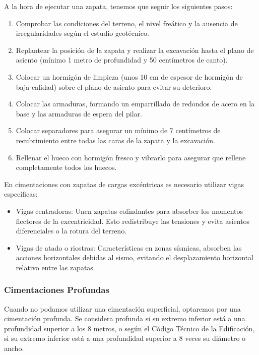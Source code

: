 A la hora de ejecutar una zapata, tenemos que seguir los siguientes pasos:
\begin{enumerate}
    \item Comprobar las condiciones del terreno, el nivel freático y la ausencia de irregularidades según el estudio geotécnico.
    \item Replantear la posición de la zapata y realizar la excavación hasta el plano de asiento (mínimo 1 metro de profundidad y 50 centímetros de canto).
    \item Colocar un hormigón de limpieza (unos 10 cm de espesor de hormigón de baja calidad) sobre el plano de asiento para evitar su deterioro.
    \item Colocar las armaduras, formando un emparrillado de redondos de acero en la base y las armaduras de espera del pilar.
    \item Colocar separadores para asegurar un mínimo de 7 centímetros de recubrimiento entre todas las caras de la zapata y la excavación.
    \item Rellenar el hueco con hormigón fresco y vibrarlo para asegurar que rellene completamente todos los huecos.
\end{enumerate}

En cimentaciones con zapatas de cargas excéntricas es necesario utilizar vigas específicas:

\begin{itemize}
    \item Vigas centradoras: Unen zapatas colindantes para absorber los momentos flectores de la excentricidad. Esto redistribuye las tensiones y evita asientos diferenciales o la rotura del terreno.
    \item Vigas de atado o riostras: Características en zonas sísmicas, absorben las acciones horizontales debidas al sismo, evitando el desplazamiento horizontal relativo entre las zapatas.
\end{itemize}

\subsubsection{Cimentaciones Profundas}

Cuando no podamos utilizar una cimentación superficial, optaremos por una cimentación profunda. Se considera profunda si su extremo inferior está a una profundidad superior a los 8 metros, o según el Código Técnico de la Edificación, si su extremo inferior está a una profundidad superior a 8 veces su diámetro o ancho.

